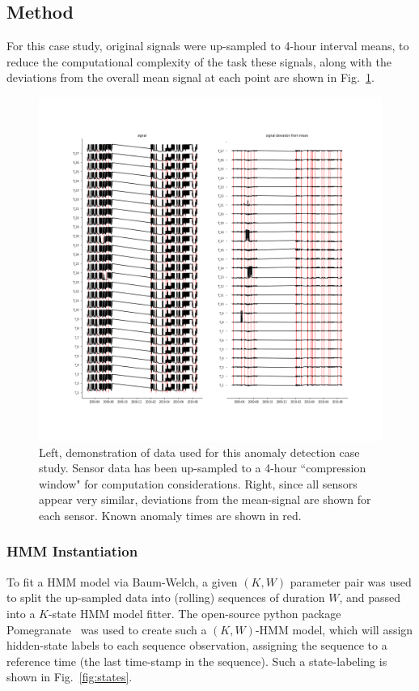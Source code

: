 \documentclass[twocolumn,10pt]{article}
\begin{document}
\subsection{Method}
For this case study, original signals were up-sampled to 4-hour interval means, to reduce the computational complexity of the task these signals, along with the deviations from the overall mean signal at each point are shown in Fig.~\ref{fig:signals}.
\begin{figure}
    \centering
    \includegraphics[width=\linewidth]{img/signal_plot.png}
    \caption{Left, demonstration of data used for this anomaly detection case study. Sensor data has been up-sampled to a 4-hour ``compression window" for computation considerations. Right, since all sensors appear very similar, deviations from the mean-signal are shown for each sensor. Known anomaly times are shown in red. }
    \label{fig:signals}
\end{figure}

\subsubsection{HMM Instantiation}
To fit a HMM model via Baum-Welch, a given $(K,W)$ parameter pair was used to split the up-sampled data into (rolling) sequences of duration $W$, and passed into a $K$-state HMM model fitter. The open-source python package Pomegranate~\cite{pomegranate} was used to create such a $(K,W)$-HMM model, which will assign hidden-state labels to each sequence observation, assigning the sequence to a reference time (the last time-stamp in the sequence). Such a state-labeling is shown in Fig.~\ref{fig:states}. 
\end{document}
